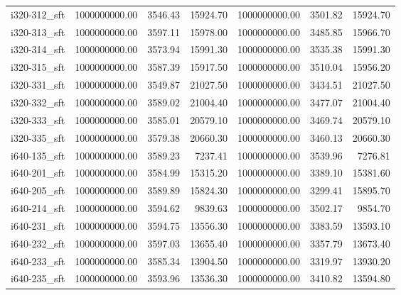 \begin{tabular}{lrrrrrr}
i320-312\_sft &      1000000000.00 &                3546.43 &         15924.70 &    1000000000.00 &              3501.82 &       15924.70 \\
i320-313\_sft &      1000000000.00 &                3597.11 &         15978.00 &    1000000000.00 &              3485.85 &       15966.70 \\
i320-314\_sft &      1000000000.00 &                3573.94 &         15991.30 &    1000000000.00 &              3535.38 &       15991.30 \\
i320-315\_sft &      1000000000.00 &                3587.39 &         15917.50 &    1000000000.00 &              3510.04 &       15956.20 \\
i320-331\_sft &      1000000000.00 &                3549.87 &         21027.50 &    1000000000.00 &              3434.51 &       21027.50 \\
i320-332\_sft &      1000000000.00 &                3589.02 &         21004.40 &    1000000000.00 &              3477.07 &       21004.40 \\
i320-333\_sft &      1000000000.00 &                3585.01 &         20579.10 &    1000000000.00 &              3469.74 &       20579.10 \\
i320-335\_sft &      1000000000.00 &                3579.38 &         20660.30 &    1000000000.00 &              3460.13 &       20660.30 \\
i640-135\_sft &      1000000000.00 &                3589.23 &          7237.41 &    1000000000.00 &              3539.96 &        7276.81 \\
i640-201\_sft &      1000000000.00 &                3584.99 &         15315.20 &    1000000000.00 &              3389.10 &       15381.60 \\
i640-205\_sft &      1000000000.00 &                3589.89 &         15824.30 &    1000000000.00 &              3299.41 &       15895.70 \\
i640-214\_sft &      1000000000.00 &                3594.62 &          9839.63 &    1000000000.00 &              3502.17 &        9854.70 \\
i640-231\_sft &      1000000000.00 &                3594.75 &         13556.30 &    1000000000.00 &              3383.59 &       13593.10 \\
i640-232\_sft &      1000000000.00 &                3597.03 &         13655.40 &    1000000000.00 &              3357.79 &       13673.40 \\
i640-233\_sft &      1000000000.00 &                3585.34 &         13904.50 &    1000000000.00 &              3319.97 &       13930.20 \\
i640-235\_sft &      1000000000.00 &                3593.96 &         13536.30 &    1000000000.00 &              3410.82 &       13594.80 \\
\bottomrule
\end{tabular}
